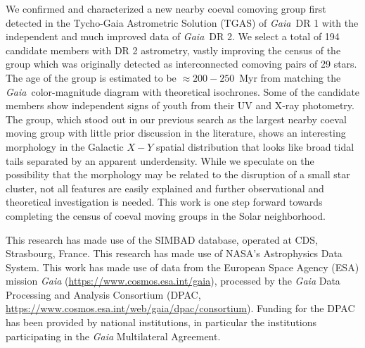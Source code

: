 \documentclass[modern,letterpaper]{aastex61}
\newcommand{\project}[1]{\textsl{#1}}
\newcommand{\acronym}[1]{{\small{#1}}}
\newcommand{\gaia}{\project{Gaia}}
\newcommand{\tgas}{\acronym{TGAS}}
\begin{document}
We confirmed and characterized a new nearby coeval comoving group first detected
in the Tycho-Gaia Astrometric Solution (\tgas) of \gaia\ DR 1 with
the independent and much improved data of \gaia\ DR 2.
We select a total of 194 candidate members with DR 2 astrometry,
vastly improving the census of the group which was originally detected as
interconnected comoving pairs of 29 stars.
The age of the group is estimated to be $\approx200-250$~Myr from
matching the \gaia\ color-magnitude diagram with theoretical isochrones.
Some of the candidate members show independent signs of youth from their
UV and X-ray photometry.
The group, which stood out in our previous search as the largest nearby
coeval moving group with little prior discussion in the literature,
shows an interesting morphology in the Galactic $X-Y$ spatial distribution
that looks like broad tidal tails separated by an apparent underdensity.
While we speculate on the possibility that the morphology may be related
to the disruption of a small star cluster,
not all features are easily explained and further
observational and theoretical investigation is needed.
This work is one step forward towards completing the census of
coeval moving groups in the Solar neighborhood.




\acknowledgements %
This research has made use of the SIMBAD database,
operated at CDS, Strasbourg, France.
This research has made use of NASA's Astrophysics Data System.
This work has made use of data from the European Space Agency (ESA) mission
{\it Gaia} (\url{https://www.cosmos.esa.int/gaia}), processed by the {\it Gaia}
Data Processing and Analysis Consortium (DPAC,
\url{https://www.cosmos.esa.int/web/gaia/dpac/consortium}). Funding for the DPAC
has been provided by national institutions, in particular the institutions
participating in the {\it Gaia} Multilateral Agreement.




\end{document}
